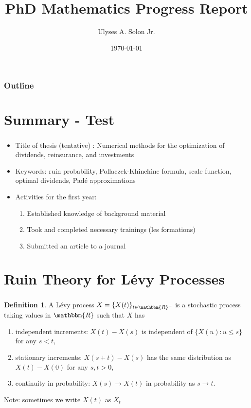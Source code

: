 \documentclass[xcolor=pdftex,dvipsnames,table]{beamer}
\title[PhD Mathematics Progress Report]{PhD Mathematics Progress Report}
\author[U. Solon]{Ulyses A. Solon Jr.}
\date[\today]{\today}
\newcommand{\R}{\mathbbm{R}}
\theoremstyle{definition}
\newtheorem*{defn}{Definition}
\def\enumb{\begin{enumerate}}
\def\enume{\end{enumerate}}
\begin{document}
\begin{frame}
\titlepage
\end{frame}

\begin{frame}
\frametitle{Outline}
\tableofcontents
\end{frame}

\section{Summary - Test}
\begin{frame}
\frametitle{\insertsectionhead}
\begin{itemize}
\item Title of thesis (tentative) : Numerical methods for the optimization of dividends, reinsurance, and investments
\item Keywords: ruin probability, Pollaczek-Khinchine formula, scale function, optimal dividends, Pad\'e approximations
\item Activities for the first year:
\begin{enumerate}
\item Established knowledge of background material
\item Took and completed necessary trainings (les formations)
\item Submitted an article to a journal
\end{enumerate}
\end{itemize}
\end{frame}

\section{Ruin Theory for L\'evy Processes}
\begin{frame}
\frametitle{\insertsectionhead}
\begin{defn}
A L\'evy process $X = \{ X(t) \}_{t \in \R^+ }$ is a stochastic process taking values in $\R$ such that $X$ has
\enumb
\item independent increments: $X(t)-X(s)$ is independent of $\{ X(u) : u \leq s \}$ for any ${s<t}$,
\item stationary increments: $X(s+t)-X(s)$ has the same distribution as $X(t)-X(0)$ for any ${s,t>0}$,
\item continuity in probability: $ X(s) \rightarrow X(t) $ in probability as $s \rightarrow t$.
\enume
\end{defn}
Note: sometimes we write $X(t)$ as $X_t$
\end{frame}
\end{document}
